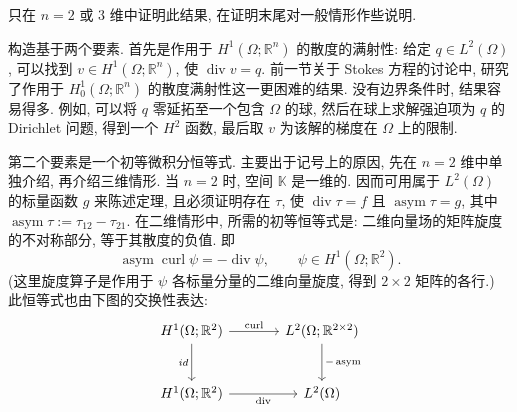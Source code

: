 \begin{Proof}
只在 $n=2$ 或 $3$ 维中证明此结果, 在证明末尾对一般情形作些说明.

构造基于两个要素. 首先是作用于 $H^1(\Omega;\mathbb R^n)$ 的散度的满射性: 给定 $q\in L^2(\Omega)$, 可以找到 $v\in H^1(\Omega;\mathbb R^n)$, 使 $\operatorname{div}v=q$. 前一节关于 Stokes 方程的讨论中, 研究了作用于 $ H_{0}^1(\Omega;\mathbb R^n)$ 的散度满射性这一更困难的结果. 没有边界条件时, 结果容易得多. 例如, 可以将 $q$ 零延拓至一个包含 $\Omega$ 的球, 然后在球上求解强迫项为 $q$ 的 Dirichlet 问题, 得到一个 $H^2$ 函数, 最后取 $v$ 为该解的梯度在 $\Omega$ 上的限制.

第二个要素是一个初等微积分恒等式. 主要出于记号上的原因, 先在 $n=2$ 维中单独介绍, 再介绍三维情形. 当 $n=2$ 时, 空间 $\mathbb K$ 是一维的. 因而可用属于 $L^2(\Omega)$ 的标量函数 $g$ 来陈述定理, 且必须证明存在 $\tau$, 使 $\operatorname{div}\tau=f$ 且 $\operatorname{asym}\tau=g$, 其中 $\operatorname{asym}\tau:=\tau_{12}-\tau_{21}$. 在二维情形中, 所需的初等恒等式是: 二维向量场的矩阵旋度的不对称部分, 等于其散度的负值. 即
\begin{equation}\label{eq:asym-curl-divergence-identity}
\operatorname{asym}\operatorname{curl}\psi=-\operatorname{div}\psi,\qquad\psi\in H^1(\Omega;\mathbb R^2).
\end{equation}
(这里旋度算子是作用于 $\psi$ 各标量分量的二维向量旋度, 得到 $2\times2$ 矩阵的各行.) 此恒等式也由下图的交换性表达:
\[
\begin{tikzcd}[column sep=large,row sep=large]
H^1(\Omega;\mathbb R^2)\arrow[r,"\operatorname{curl}"]\arrow[d,"id"']&L^2(\Omega;\mathbb R^{2\times2})\arrow[d,"-\operatorname{asym}"]\\
H^1(\Omega;\mathbb R^2)\arrow[r,"\operatorname{div}"']&L^2(\Omega)
\end{tikzcd}
\]


\end{Proof}
